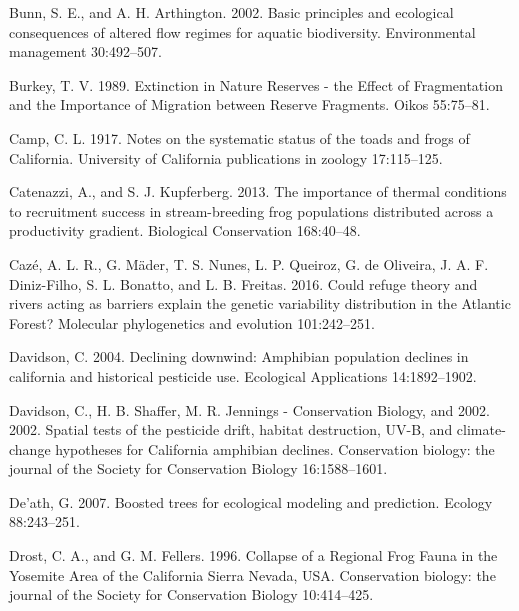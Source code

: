 \documentclass[proquest,12pt,final]{ucthesis-CA2012} %
\begin{document}
\begin{ucmainmatter}
\leavevmode\hypertarget{ref-bunn_basic_2002}{}%
Bunn, S. E., and A. H. Arthington. 2002. Basic principles and ecological
consequences of altered flow regimes for aquatic biodiversity.
Environmental management 30:492--507.

\leavevmode\hypertarget{ref-burkey_extinction_1989}{}%
Burkey, T. V. 1989. Extinction in Nature Reserves - the Effect of
Fragmentation and the Importance of Migration between Reserve Fragments.
Oikos 55:75--81.

\leavevmode\hypertarget{ref-camp_notes_1917}{}%
Camp, C. L. 1917. Notes on the systematic status of the toads and frogs
of California. University of California publications in zoology
17:115--125.

\leavevmode\hypertarget{ref-catenazzi_importance_2013}{}%
Catenazzi, A., and S. J. Kupferberg. 2013. The importance of thermal
conditions to recruitment success in stream-breeding frog populations
distributed across a productivity gradient. Biological Conservation
168:40--48.

\leavevmode\hypertarget{ref-caze_could_2016}{}%
Cazé, A. L. R., G. Mäder, T. S. Nunes, L. P. Queiroz, G. de Oliveira, J.
A. F. Diniz-Filho, S. L. Bonatto, and L. B. Freitas. 2016. Could refuge
theory and rivers acting as barriers explain the genetic variability
distribution in the Atlantic Forest? Molecular phylogenetics and
evolution 101:242--251.

\leavevmode\hypertarget{ref-davidson_declining_2004}{}%
Davidson, C. 2004. Declining downwind: Amphibian population declines in
california and historical pesticide use. Ecological Applications
14:1892--1902.

\leavevmode\hypertarget{ref-davidson_spatial_2002}{}%
Davidson, C., H. B. Shaffer, M. R. Jennings - Conservation Biology, and
2002. 2002. Spatial tests of the pesticide drift, habitat destruction,
UV-B, and climate-change hypotheses for California amphibian declines.
Conservation biology: the journal of the Society for Conservation
Biology 16:1588--1601.

\leavevmode\hypertarget{ref-death_boosted_2007}{}%
De'ath, G. 2007. Boosted trees for ecological modeling and prediction.
Ecology 88:243--251.

\leavevmode\hypertarget{ref-drost_collapse_1996}{}%
Drost, C. A., and G. M. Fellers. 1996. Collapse of a Regional Frog Fauna
in the Yosemite Area of the California Sierra Nevada, USA. Conservation
biology: the journal of the Society for Conservation Biology
10:414--425.


\end{ucmainmatter}
\end{document}
